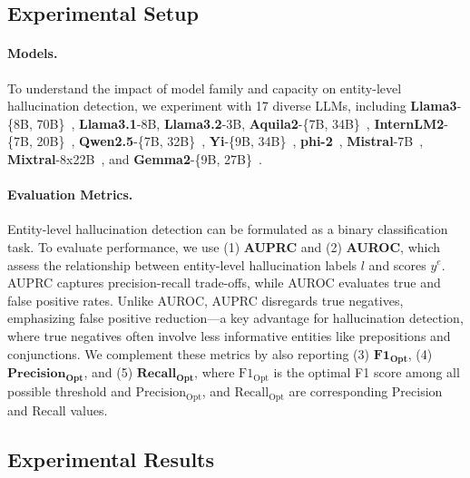 \subsection{Experimental Setup}




\paragraph{Models.}

To understand the impact of model family and capacity on entity-level hallucination detection, we experiment with 17 diverse LLMs, including \textbf{Llama3}-\{8B, 70B\}~\citep{grattafiori2024llama3herdmodels}, \textbf{Llama3.1}-8B, \textbf{Llama3.2}-3B, \textbf{Aquila2}-\{7B, 34B\}~\citep{zhang2024aquila2technicalreport}, \textbf{InternLM2}-\{7B, 20B\}~\citep{cai2024internlm2technicalreport}, \textbf{Qwen2.5}-\{7B, 32B\}~\citep{qwen2025qwen25technicalreport}, \textbf{Yi}-\{9B, 34B\}~\citep{ai2024yiopenfoundationmodels}, \textbf{phi-2}~\citep{gunasekar2023textbooksneed}, \textbf{Mistral}-7B~\citep{jiang2023mistral7b}, \textbf{Mixtral}-8x22B~\citep{jiang2024mixtralexperts}, and \textbf{Gemma2}-\{9B, 27B\}~\citep{gemmateam2024gemma2improvingopen}.




\paragraph{Evaluation Metrics.}

Entity-level hallucination detection can be formulated as a binary classification task. To evaluate performance, we use (1) \textbf{AUPRC} and (2) \textbf{AUROC}, which assess the relationship between entity-level hallucination labels $l$ and scores $y^e$. AUPRC captures precision-recall trade-offs, while AUROC evaluates true and false positive rates. Unlike AUROC, AUPRC disregards true negatives, emphasizing false positive reduction---a key advantage for hallucination detection, where true negatives often involve less informative entities like prepositions and conjunctions. 
We complement these metrics by also reporting (3) $\mathbf{F1}_\mathbf{Opt}$, (4) $\mathbf{Precision}_\mathbf{Opt}$, and (5) $\mathbf{Recall}_\mathbf{Opt}$, where $\mathrm{F1}_\mathrm{Opt}$ is the optimal F1 score among all possible threshold and $\mathrm{Precision}_\mathrm{Opt}$, and $\mathrm{Recall}_\mathrm{Opt}$ are corresponding Precision and Recall values.


\subsection{Experimental Results}\label{sec:result}



